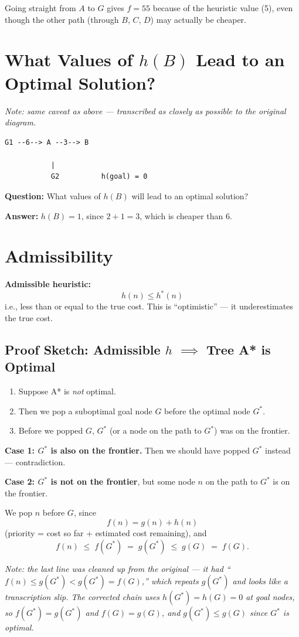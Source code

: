 \documentclass{article}
\begin{document}
Going straight from $A$ to $G$ gives $f = 55$ because of the heuristic value (5), even though the other path (through $B$, $C$, $D$) may actually be cheaper.

\section{What Values of $h(B)$ Lead to an Optimal Solution?}

\textit{Note: same caveat as above --- transcribed as closely as possible to the original diagram.}

\begin{verbatim}
G1 --6--> A --3--> B

           |
           G2          h(goal) = 0
\end{verbatim}

\textbf{Question:} What values of $h(B)$ will lead to an optimal solution?

\textbf{Answer:} $h(B) = 1$, since $2 + 1 = 3$, which is cheaper than $6$.

\section{Admissibility}

\textbf{Admissible heuristic:}
\[
h(n) \le h^*(n)
\]
i.e., less than or equal to the true cost. This is ``optimistic'' --- it underestimates the true cost.

\subsection{Proof Sketch: Admissible $h$ $\implies$ Tree A* is Optimal}

\begin{enumerate}[label=\arabic*.]
    \item Suppose A* is \emph{not} optimal.
    \item Then we pop a suboptimal goal node $G$ before the optimal node $G^*$.
    \item Before we popped $G$, $G^*$ (or a node on the path to $G^*$) was on the frontier.
\end{enumerate}

\textbf{Case 1: $G^*$ is also on the frontier.}
Then we should have popped $G^*$ instead --- contradiction.

\textbf{Case 2: $G^*$ is not on the frontier}, but some node $n$ on the path to $G^*$ is on the frontier.

We pop $n$ before $G$, since
\[
f(n) = g(n) + h(n)
\]
(priority = cost so far + estimated cost remaining), and
\[
f(n) \;\le\; f(G^*) \;=\; g(G^*) \;\le\; g(G) \;=\; f(G).
\]

\textit{Note: the last line was cleaned up from the original --- it had ``$f(n) \le g(G^*) < g(G^*) = f(G)$,'' which repeats $g(G^*)$ and looks like a transcription slip. The corrected chain uses $h(G^*) = h(G) = 0$ at goal nodes, so $f(G^*) = g(G^*)$ and $f(G) = g(G)$, and $g(G^*) \le g(G)$ since $G^*$ is optimal.}
\end{document}

